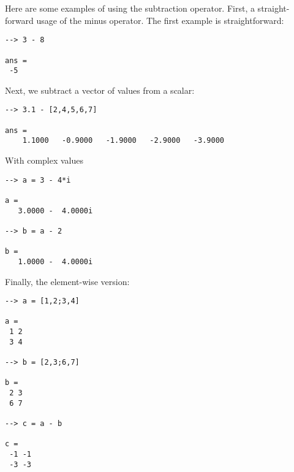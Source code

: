 Here are some examples of using the subtraction operator.  First, a 
straight-forward usage of the minus operator.  The first example
is straightforward:
\begin{verbatim}
--> 3 - 8

ans = 
 -5 
\end{verbatim}
Next, we subtract a vector of values from a scalar:
\begin{verbatim}
--> 3.1 - [2,4,5,6,7]

ans = 
    1.1000   -0.9000   -1.9000   -2.9000   -3.9000 
\end{verbatim}
With complex values
\begin{verbatim}
--> a = 3 - 4*i

a = 
   3.0000 -  4.0000i 

--> b = a - 2

b = 
   1.0000 -  4.0000i 
\end{verbatim}
Finally, the element-wise version:
\begin{verbatim}
--> a = [1,2;3,4]

a = 
 1 2 
 3 4 

--> b = [2,3;6,7]

b = 
 2 3 
 6 7 

--> c = a - b

c = 
 -1 -1 
 -3 -3 
\end{verbatim}

